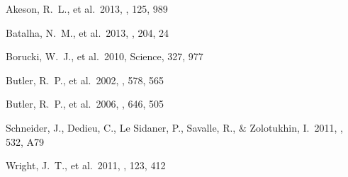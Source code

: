 \begin{thebibliography}

 Akeson, R.~L., et al.\ 2013, 
\pasp, 125, 989 %

 Batalha, N.~M., et al.\ 2013, 
\apjs, 204, 24 %

 Borucki, W.~J., et al.\ 2010, 
Science, 327, 977 %

 Butler, R.~P., et al.\ 2002, 
\apj, 578, 565 %

 Butler, R.~P., et al.\ 2006, 
\apj, 646, 505 %

 Schneider, J., Dedieu, C., 
Le Sidaner, P., Savalle, R., \& Zolotukhin, I.\ 2011, \aap, 532, A79

 Wright, J.~T., et al.\ 2011,
  \pasp, 123, 412 %

\end{thebibliography}
